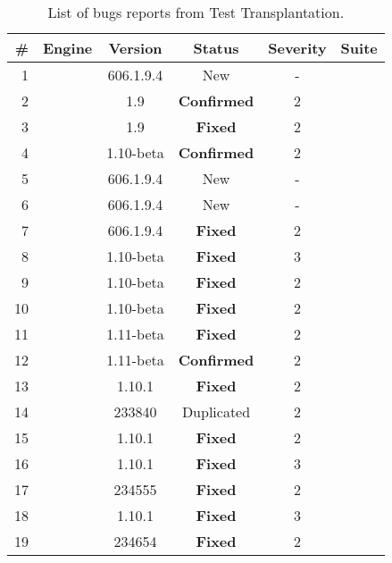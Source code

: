 \begin{table}[t!]
  \renewcommand{\arraystretch}{0.9}
      \centering
      \caption{List of bugs reports from Test Transplantation.}
      \label{tab:test-transplantation-bugs}

      \begin{tabular}{rccccc}

        \toprule \# & Engine  & Version & Status & Severity & Suite \\
        \midrule
       1  & \jsc{} & 606.1.9.4 & New  & - & \jerry{} \\
       2  & \chakra{}  & 1.9 & \textbf{Confirmed} & 2 & \smonkey{} \\
       3  & \chakra{}  & 1.9 & \textbf{Fixed}   & 2 & \smonkey{} \\
       4  & \chakra{} & 1.10-beta & \textbf{Confirmed} & 2 & \smonkey{} \\
       5  & \jsc{} & 606.1.9.4 & New &  -  & \smonkey{}\\
       6  & \jsc{} & 606.1.9.4 & New & - & \smonkey{} \\
       7  & \jsc{} & 606.1.9.4 & \textbf{Fixed} & 2 & \smonkey{}\\ %
       8  & \chakra{} & 1.10-beta & \textbf{Fixed} & 3 & \smonkey{}\\
       9  & \chakra{} & 1.10-beta & \textbf{Fixed} & 2 & \jsc{}\\
       10 & \chakra{} & 1.10-beta & \textbf{Fixed} & 2 & \smonkey{}\\
       11 & \chakra{} & 1.11-beta & \textbf{Fixed} & 2 & \jsc{}\\
       12 & \chakra{} & 1.11-beta & \textbf{Confirmed} & 2 & \jerry{}\\ %
       13 & \chakra{} & 1.10.1 & \textbf{Fixed} & 2 & \smonkey{}\\
       14 & \jsc{} & 233840 & Duplicated & 2 & \jerry{}\\
       15 & \chakra{} & 1.10.1 & \textbf{Fixed} & 2 & \jerry{}\\ %
       16 & \chakra{} & 1.10.1 & \textbf{Fixed} & 3 & \jerry{}\\
       17 & \jsc{} & 234555 &\textbf{Fixed} & 2 & \jerry{}\\
       18 & \chakra{} & 1.10.1 & \textbf{Fixed} & 3 & \jerry{}\\
       19 & \jsc{} & 234654 & \textbf{Fixed} & 2 & \jerry{}\\

\end{tabular}
\end{table}
